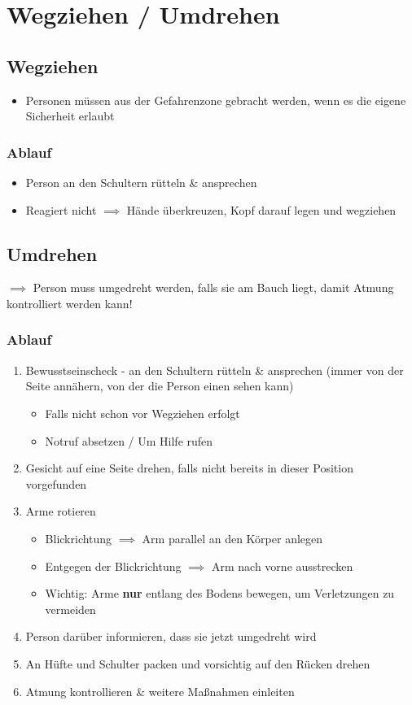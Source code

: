 \chapter{Wegziehen / Umdrehen}

\section{Wegziehen}
\begin{itemize}
    \item Personen müssen aus der Gefahrenzone gebracht werden, wenn es die eigene Sicherheit erlaubt
\end{itemize}
\subsection*{Ablauf}
\begin{itemize}
    \item Person an den Schultern rütteln \& ansprechen
    \item Reagiert nicht $\implies$ Hände überkreuzen, Kopf darauf legen und wegziehen
\end{itemize}

\section{Umdrehen}
$\implies$ Person muss umgedreht werden, falls sie am Bauch liegt, damit Atmung kontrolliert werden kann!

\subsection*{Ablauf}
\begin{enumerate}
    \item Bewusstseinscheck - an den Schultern rütteln \& ansprechen (immer von der Seite annähern, von der die Person einen sehen kann)
    \begin{itemize}
        \item Falls nicht schon vor Wegziehen erfolgt
        \item Notruf absetzen / Um Hilfe rufen
    \end{itemize}
    \item Gesicht auf eine Seite drehen, falls nicht bereits in dieser Position vorgefunden
    \item Arme rotieren
    \begin{itemize}
        \item Blickrichtung $\implies$ Arm parallel an den Körper anlegen
        \item Entgegen der Blickrichtung $\implies$ Arm nach vorne ausstrecken
        \item Wichtig: Arme \textbf{nur} entlang des Bodens bewegen, um Verletzungen zu vermeiden
    \end{itemize}
    \item Person darüber informieren, dass sie jetzt umgedreht wird
    \item An Hüfte und Schulter packen und vorsichtig auf den Rücken drehen
    \item Atmung kontrollieren \& weitere Maßnahmen einleiten
\end{enumerate}

